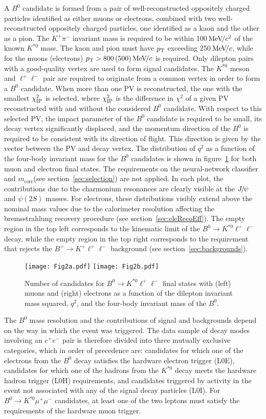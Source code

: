 \documentclass[12pt,a4paper]{article}
\def\lplm       {\ensuremath{\ell^+ \ell^-}\xspace}
\def\Pmu         {\ensuremath{\upmu}\xspace}
\def\Ppi         {\ensuremath{\uppi}\xspace}
\def\Ppsi        {\ensuremath{\uppsi}\xspace}
\def\PB      {\ensuremath{\mathrm{B}}\xspace}
\def\PJ      {\ensuremath{\mathrm{J}}\xspace}
\def\PK      {\ensuremath{\mathrm{K}}\xspace}
\def\Pe      {\ensuremath{\mathrm{e}}\xspace}
\def\Pmu         {\ensuremath{\mu}\xspace}
\def\Ppi         {\ensuremath{\pi}\xspace}
\def\Ppsi        {\ensuremath{\psi}\xspace}
\def\PB      {\ensuremath{B}\xspace}
\def\PJ      {\ensuremath{J}\xspace}
\def\PK      {\ensuremath{K}\xspace}
\def\Pe      {\ensuremath{e}\xspace}
\def\epem       {\ensuremath{\Pe^+\Pe^-}\xspace}
\def\mup        {\ensuremath{\Pmu^+}\xspace}
\def\mun        {\ensuremath{\Pmu^-}\xspace} \def\mumu       {\ensuremath{\Pmu^+\Pmu^-}\xspace}
\def\ellm       {\ensuremath{\ell^-}\xspace}
\def\ellp       {\ensuremath{\ell^+}\xspace}
\def\pion  {\ensuremath{\Ppi}\xspace}
\def\pim   {\ensuremath{\pion^-}\xspace}
\def\kaon  {\ensuremath{\PK}\xspace}
\def\Kp    {\ensuremath{\kaon^+}\xspace}
\def\Kstarz  {\ensuremath{\kaon^{*0}}\xspace}
\def\B       {\ensuremath{\PB}\xspace}
\def\Bz      {\ensuremath{\B^0}\xspace}
\def\Bu      {\ensuremath{\B^+}\xspace}
\def\Bd      {\ensuremath{\B^0}\xspace}
\def\jpsi     {\ensuremath{{\PJ\mskip -3mu/\mskip -2mu\Ppsi\mskip 2mu}}\xspace}
\def\psitwos  {\ensuremath{\Ppsi{(2S)}}\xspace}
\newcommand{\decay}[2]{\ensuremath{#1\!\to #2}\xspace}         \def\ra                 {\ensuremath{\rightarrow}\xspace}
\def\to                 {\ensuremath{\rightarrow}\xspace}
\def\qsq       {\ensuremath{q^2}\xspace}
\def\BdToKstmm    {\decay{\Bd}{\Kstarz\mup\mun}}
\newcommand{\mevc}{\ensuremath{{\mathrm{\,Me\kern -0.1em V\!/}c}}\xspace}
\newcommand{\mevcc}{\ensuremath{{\mathrm{\,Me\kern -0.1em V\!/}c^2}}\xspace}
\newcommand{\chisq}{\ensuremath{\chi^2}\xspace}
\newcommand{\chisqip}{\ensuremath{\chi^2_{\rm IP}}\xspace}
\def\pt         {\mbox{$p_{\rm T}$}\xspace}
\def\loe{\textrm{L0E}\xspace}
\def\loh{\textrm{L0H}\xspace}
\def\loi{\textrm{L0I}\xspace}
\def\mcorr{\ensuremath{m_{\textrm{corr}}}\xspace}
\def\KPi{\ensuremath{\Kp\pim}\xspace}
\def\ll{\ensuremath{\ellp\ellm}\xspace}
\def\BdToKstll{\mbox{\decay{\Bd}{\Kstarz \ll}}\xspace}
\def\BdToKstmm{\mbox{\decay{\Bd}{\Kstarz \mumu}}\xspace}
\def\BuToKll{\mbox{\decay{\Bu}{\Kp \ll}}\xspace}
\begin{document}
A \Bz candidate is formed from a pair of well-reconstructed oppositely charged particles identified as either muons or electrons, combined with two well-reconstructed oppositely charged particles, one identified as a kaon and the other as  a pion.
The \KPi invariant mass is required to be within 100\mevcc of the known \Kstarz mass. 
The kaon and pion must have \pt exceeding 250\mevc, while for the muons (electrons) $\pt > 800 \, (500)\mevc$ is required.
Only dilepton pairs with a good-quality vertex are used to form signal candidates. 
The \Kstarz meson and \lplm pair are required to originate from a common vertex in order to form a \Bz candidate. 
When more than one PV is reconstructed, the one with the smallest \chisqip is selected, where \chisqip is the difference in \chisq of a given PV reconstructed with and without the considered \Bz candidate.
With respect to this selected PV, the impact parameter of the \Bz candidate is required to be small, its decay vertex significantly displaced, and the momentum direction of the \Bz is required to be consistent with its direction of flight.
This direction is given by the vector between the PV and decay vertex. 
The distribution of \qsq as a function of the four-body invariant mass for the \Bz candidates is shown in figure~\ref{fig:q2vsB} for both muon and electron final states. 
The requirements on the neural-network classifier and \mcorr (see section~\ref{sec:selection}) are not applied.
In each plot, the contributions due to the charmonium resonances are clearly visible at the \jpsi and \psitwos masses.
For electrons, these distributions visibly extend above the nominal mass values due to the calorimeter resolution affecting the bremsstrahlung recovery procedure (see section~\ref{sec:eleRecoEff}).
The empty region in the top left corresponds to the kinematic limit of the \BdToKstll decay, while the empty region in the top right corresponds to the requirement that rejects the \BuToKll background (see section~\ref{sec:backgrounds}).
 
\begin{figure}[t!]
\centering
\texttt{[image: Fig2a.pdf]} 
\texttt{[image: Fig2b.pdf]}
\caption{Number of candidates for \BdToKstll final states with (left) muons and (right) electrons as a function of the dilepton invariant mass squared, \qsq, and the four-body invariant mass of the \Bz.}
\label{fig:q2vsB}
\end{figure}

The \Bz mass resolution and the contributions of signal and backgrounds depend on the way in which the event was triggered.
The data sample of decay modes involving an \epem pair is therefore divided into three mutually exclusive categories, which in order of precedence are: candidates for which one of the electrons from the \Bz decay satisfies the hardware electron trigger (\loe), candidates for which one of the hadrons from the \Kstarz decay meets the hardware hadron trigger (\loh) requirements, and candidates triggered by activity in the event not associated with any of the signal decay particles (\loi). 
For \BdToKstmm candidates, at least one of the two leptons must satisfy the requirements of the hardware muon trigger.
\end{document}

